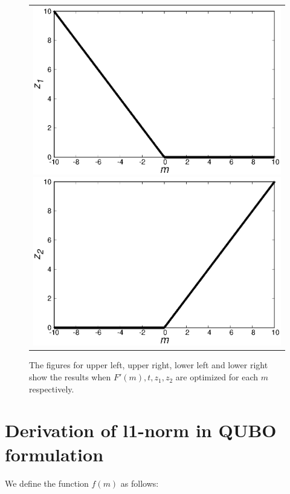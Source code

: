 \documentclass[fp,twocolumn]{jpsj3}
\begin{document}
\begin{figure}[htbp]
\begin{center}
\begin{tabular}{c}
\begin{minipage}{0.50\hsize}
        \includegraphics[keepaspectratio,scale=0.33]{minimum_z1.eps}
      \end{minipage}
      \begin{minipage}{0.50\hsize}
        \centering
        \includegraphics[keepaspectratio,scale=0.33]{minimum_z2.eps}
      \end{minipage}
    \end{tabular}
    \caption{The figures for upper left, upper right, lower left and lower right show the results when $F'(m), t, z_{1}, z_{2}$ are optimized for each $m$ respectively.}
    \label{fig:minimum1}
  \end{center}
\end{figure}

\section{Derivation of l1-norm in QUBO formulation} %
We define the function $f(m)$ as follows:
\end{document}

